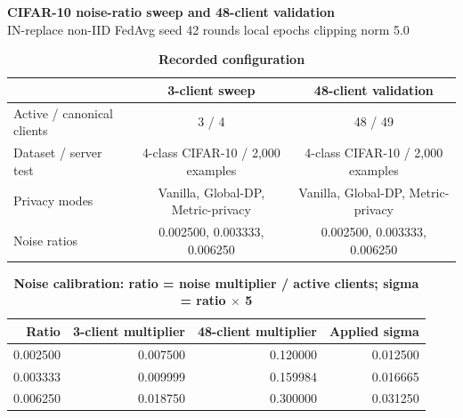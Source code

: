\documentclass[10pt,a4paper,landscape]{article}
\begin{document}
\begin{center}
{\LARGE\bfseries CIFAR-10 noise-ratio sweep and 48-client validation}\\[4pt]
{\small IN-replace \quad non-IID \quad FedAvg \quad seed 42  rounds  local epochs \quad clipping norm 5.0}
\end{center}

\begin{table}[h]
\centering
\caption*{\bfseries Recorded configuration}
\begin{tabular}{lcc}
\toprule
& 3-client sweep & 48-client validation \\
\midrule
Active / canonical clients & 3 / 4 & 48 / 49 \\
Dataset / server test & 4-class CIFAR-10 / 2,000 examples & 4-class CIFAR-10 / 2,000 examples \\
Privacy modes & Vanilla, Global-DP, Metric-privacy & Vanilla, Global-DP, Metric-privacy \\
Noise ratios & 0.002500, 0.003333, 0.006250 & 0.002500, 0.003333, 0.006250 \\
\bottomrule
\end{tabular}
\end{table}

\begin{table}[h]
\centering
\caption*{\bfseries Noise calibration: ratio = noise multiplier / active clients; sigma = ratio $\times$ 5}
\begin{tabular}{rrrr}
\toprule
Ratio & 3-client multiplier & 48-client multiplier & Applied sigma \\
\midrule
0.002500 & 0.007500 & 0.120000 & 0.012500 \\
0.003333 & 0.009999 & 0.159984 & 0.016665 \\
0.006250 & 0.018750 & 0.300000 & 0.031250 \\
\bottomrule
\end{tabular}
\end{table}
\end{document}
